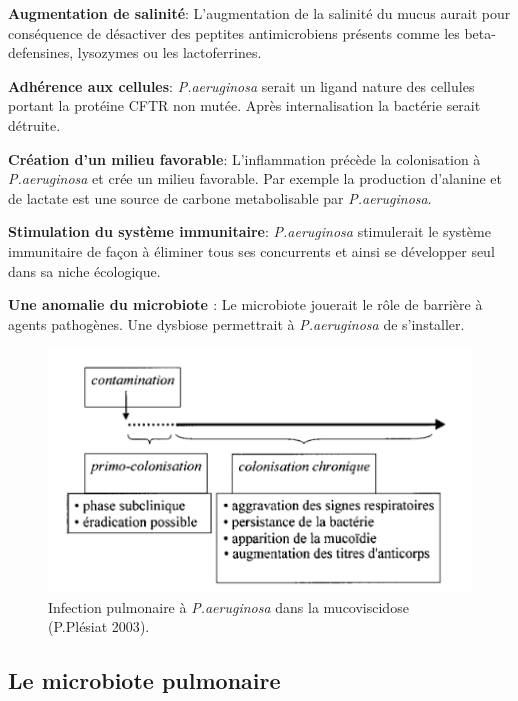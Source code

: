 \documentclass[12pt,a4paper]{article}
\begin{document}
\textbf{Augmentation de salinité}\cite{Davies}:
L'augmentation de la salinité du mucus aurait pour conséquence de désactiver des peptites antimicrobiens présents comme les beta-defensines, lysozymes ou les lactoferrines.

\textbf{Adhérence aux cellules}\cite{Davies}:
\textit{P.aeruginosa} serait un ligand nature des cellules portant la protéine CFTR non mutée. Après internalisation la bactérie serait détruite.

\textbf{Création d'un milieu favorable}:
L'inflammation précède la colonisation à \textit{P.aeruginosa} et crée un milieu favorable.
Par exemple la production d'alanine et de lactate \cite{Boulette2009} est une source de carbone metabolisable par \textit{P.aeruginosa}.

\textbf{Stimulation du système immunitaire}:
\textit{P.aeruginosa} stimulerait le système immunitaire de façon à éliminer tous ses concurrents et ainsi se développer seul dans sa niche écologique.

\textbf{Une anomalie du microbiote \cite{HoMan2017}}:
Le microbiote jouerait le rôle de barrière à agents pathogènes. Une dysbiose permettrait à \textit{P.aeruginosa} de s'installer.


\begin{figure}[ht]
\begin{center}
\includegraphics[scale=0.8]{img/chronic.png}\hfill
\end{center}
\caption{Infection pulmonaire à \textit{P.aeruginosa} dans la mucoviscidose (P.Plésiat 2003\cite{Plesiat}).}
\label{bach}
\end{figure}


\subsection{Le microbiote pulmonaire}
\end{document}
